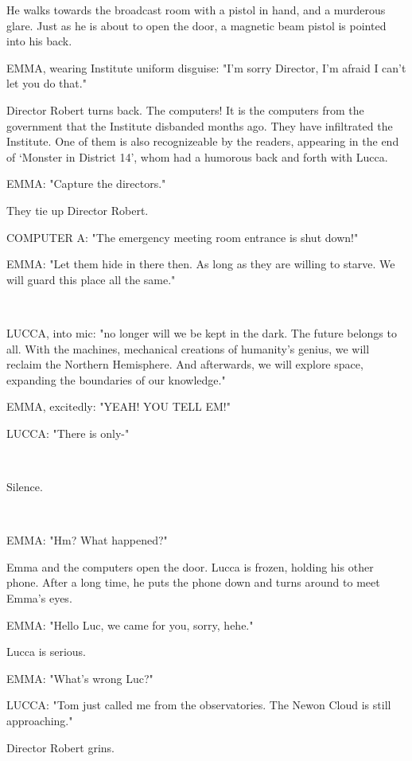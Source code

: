 \documentclass[11pt]{article}
\begin{document}
He walks towards the broadcast room with a pistol in hand, and a murderous glare. 
Just as he is about to open the door, a magnetic beam pistol is pointed into his back.

EMMA, wearing Institute uniform disguise: "I'm sorry Director, I'm afraid I can't let you do that."

Director Robert turns back. 
The computers!
It is the computers from the government that the Institute disbanded months ago. 
They have infiltrated the Institute. 
One of them is also recognizeable by the readers, appearing in the end of `Monster in District 14', whom had a humorous back and forth with Lucca.

EMMA: "Capture the directors."

They tie up Director Robert.

COMPUTER A: "The emergency meeting room entrance is shut down!"

EMMA: "Let them hide in there then. 
As long as they are willing to starve.
We will guard this place all the same."

\ 

LUCCA, into mic: "no longer will we be kept in the dark.
The future belongs to all.
With the machines, mechanical creations of humanity's genius, we will reclaim the Northern Hemisphere.
And afterwards, we will explore space, expanding the boundaries of our knowledge."

EMMA, excitedly: "YEAH! YOU TELL EM!"

LUCCA: "There is only-"

\ 

Silence.

\ 

EMMA: "Hm? What happened?"

Emma and the computers open the door.
Lucca is frozen, holding his other phone.
After a long time, he puts the phone down and turns around to meet Emma's eyes.

EMMA: "Hello Luc, we came for you, sorry, hehe."

Lucca is serious.

EMMA: "What's wrong Luc?"

LUCCA: "Tom just called me from the observatories. 
The Newon Cloud is still approaching."

Director Robert grins.
\end{document}
